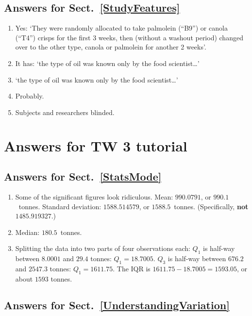 \documentclass[
  11pt,
  a4paper,
  krantz2]{krantz}
\providecommand{\tightlist}{%
  \setlength{\itemsep}{0pt}\setlength{\parskip}{0pt}}
\begin{document}
\begin{footnotesize}
\subsection*{Answers for Sect.~\ref{StudyFeatures}}\label{answers-for-sect.-refstudyfeatures}

\begin{enumerate}
\def\labelenumi{\arabic{enumi}.}
\tightlist
\item
  Yes: `They were randomly allocated to take palmolein (``B9'') or canola (``T4'') crisps for the first 3 weeks, then (without a washout period) changed over to the other type, canola or palmolein for another 2 weeks'.
\item
  It has: `the type of oil was known only by the food scientist\ldots{}'
\item
  `the type of oil was known only by the food scientist\ldots{}'
\item
  Probably.
\item
  Subjects and researchers blinded.
\end{enumerate}

\section{Answers for TW 3 tutorial}\label{Lecture3Answers}

\subsection*{Answers for Sect.~\ref{StatsMode}}\label{answers-for-sect.-refstatsmode}

\begin{enumerate}
\def\labelenumi{\arabic{enumi}.}
\tightlist
\item
  Some of the significant figures look ridiculous.
  Mean: \(990.0791\), or \(990.1\)~tonnes.
  Standard deviation: \(1588.514579\), or \(1588.5\)~tonnes.
  (Specifically, \textbf{not} \(1485.919327\).)
\item
  Median: \(180.5\)~tonnes.
\item
  Splitting the data into two parts of four observations each:
  \(Q_1\) is half-way between \(8.0001\) and \(29.4\) tonnes: \(Q_1 = 18.7005\).
  \(Q_3\) is half-way between \(676.2\) and \(2547.3\) tonnes: \(Q_1 = 1611.75\).
  The IQR is \(1611.75 - 18.7005 = 1593.05\), or about \(1593\) tonnes.
\end{enumerate}

\subsection*{Answers for Sect.~\ref{UnderstandingVariation}}\label{answers-for-sect.-refunderstandingvariation}


\end{footnotesize}
\end{document}
